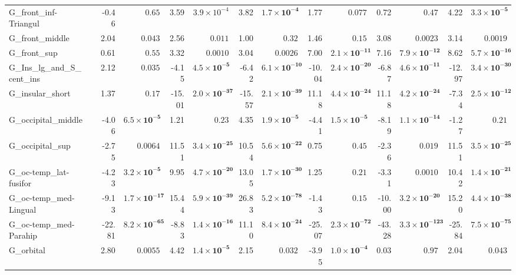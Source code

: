 {\begin{longtable}{llrrrrrrrrrrrr}
G\_front\_inf-Triangul &  & -0.46 & $0.65$ & 3.59 & $3.9{\times}10^{-4}$ & 3.82 & $\mathbf{1.7{\times}10^{-4}}$ & 1.77 & $0.077$ & 0.72 & $0.47$ & 4.22 & $\mathbf{3.3{\times}10^{-5}}$ \\
G\_front\_middle &  & 2.04 & $0.043$ & 2.56 & $0.011$ & 1.00 & $0.32$ & 1.46 & $0.15$ & 3.08 & $0.0023$ & 3.14 & $0.0019$ \\
G\_front\_sup &  & 0.61 & $0.55$ & 3.32 & $0.0010$ & 3.04 & $0.0026$ & 7.00 & $\mathbf{2.1{\times}10^{-11}}$ & 7.16 & $\mathbf{7.9{\times}10^{-12}}$ & 8.62 & $\mathbf{5.7{\times}10^{-16}}$ \\
G\_Ins\_lg\_and\_S\_cent\_ins &  & 2.12 & $0.035$ & -4.15 & $\mathbf{4.5{\times}10^{-5}}$ & -6.42 & $\mathbf{6.1{\times}10^{-10}}$ & -10.04 & $\mathbf{2.4{\times}10^{-20}}$ & -6.87 & $\mathbf{4.6{\times}10^{-11}}$ & -12.97 & $\mathbf{3.4{\times}10^{-30}}$ \\
G\_insular\_short &  & 1.37 & $0.17$ & -15.01 & $\mathbf{2.0{\times}10^{-37}}$ & -15.57 & $\mathbf{2.1{\times}10^{-39}}$ & 11.18 & $\mathbf{4.4{\times}10^{-24}}$ & 11.18 & $\mathbf{4.2{\times}10^{-24}}$ & -7.34 & $\mathbf{2.5{\times}10^{-12}}$ \\
G\_occipital\_middle &  & -4.06 & $\mathbf{6.5{\times}10^{-5}}$ & 1.21 & $0.23$ & 4.35 & $\mathbf{1.9{\times}10^{-5}}$ & -4.41 & $\mathbf{1.5{\times}10^{-5}}$ & -8.19 & $\mathbf{1.1{\times}10^{-14}}$ & -1.27 & $0.21$ \\
G\_occipital\_sup &  & -2.75 & $0.0064$ & 11.51 & $\mathbf{3.4{\times}10^{-25}}$ & 10.54 & $\mathbf{5.6{\times}10^{-22}}$ & 0.75 & $0.45$ & -2.36 & $0.019$ & 11.51 & $\mathbf{3.5{\times}10^{-25}}$ \\
G\_oc-temp\_lat-fusifor &  & -4.23 & $\mathbf{3.2{\times}10^{-5}}$ & 9.95 & $\mathbf{4.7{\times}10^{-20}}$ & 13.05 & $\mathbf{1.7{\times}10^{-30}}$ & 1.25 & $0.21$ & -3.31 & $0.0010$ & 10.42 & $\mathbf{1.4{\times}10^{-21}}$ \\
G\_oc-temp\_med-Lingual &  & -9.13 & $\mathbf{1.7{\times}10^{-17}}$ & 15.44 & $\mathbf{5.9{\times}10^{-39}}$ & 26.83 & $\mathbf{5.2{\times}10^{-78}}$ & -1.43 & $0.15$ & -10.00 & $\mathbf{3.2{\times}10^{-20}}$ & 15.20 & $\mathbf{4.4{\times}10^{-38}}$ \\
G\_oc-temp\_med-Parahip &  & -22.81 & $\mathbf{8.2{\times}10^{-65}}$ & -8.83 & $\mathbf{1.4{\times}10^{-16}}$ & 11.10 & $\mathbf{8.4{\times}10^{-24}}$ & -25.07 & $\mathbf{2.3{\times}10^{-72}}$ & -43.28 & $\mathbf{3.3{\times}10^{-123}}$ & -25.84 & $\mathbf{7.5{\times}10^{-75}}$ \\
G\_orbital &  & 2.80 & $0.0055$ & 4.42 & $\mathbf{1.4{\times}10^{-5}}$ & 2.15 & $0.032$ & -3.95 & $\mathbf{1.0{\times}10^{-4}}$ & 0.03 & $0.97$ & 2.04 & $0.043$ \\

\end{longtable}}
